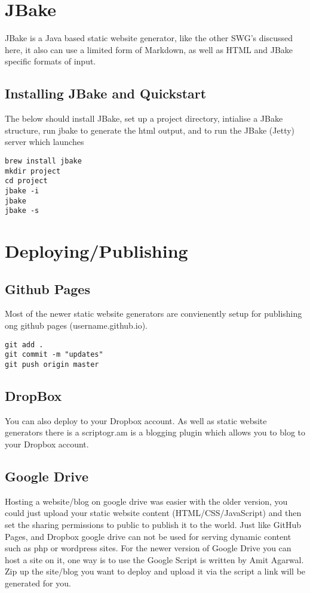 \documentclass[12pt]{article}			%
\begin{document}
\newpage
\section{JBake}
JBake is a Java based static website generator, like the other SWG's discussed here, it also can use a limited form of Markdown, as well as HTML and JBake specific formats of input.
\subsection{Installing JBake and Quickstart}
The below should install JBake, set up a project directory, intialise a JBake structure, run jbake to generate the html output, and to run the JBake (Jetty) server which launches 
\begin{verbatim}
brew install jbake
mkdir project
cd project
jbake -i
jbake
jbake -s
\end{verbatim}


\newpage
\section{Deploying/Publishing}
\subsection{Github Pages}
Most of the newer static website generators are convienently setup for publishing ong github pages (username.github.io).
\begin{verbatim}
git add .
git commit -m "updates"
git push origin master
\end{verbatim}

\subsection{DropBox}
You can also deploy to your Dropbox account. As well as static website generators there is a scriptogr.am is a blogging plugin which allows you to blog to your Dropbox account.

\subsection{Google Drive}
Hosting a website/blog on google drive was easier with the older version, you could just upload your static website content (HTML/CSS/JavaScript) and then set the sharing permissions to public to publish it to the world. Just like GitHub Pages, and Dropbox google drive can not be used for serving dynamic content such as php or wordpress sites.
For the newer version of Google Drive you can host a site on it, one way is to use the Google Script is written by Amit Agarwal. Zip up the site/blog you want to deploy and upload it via the script a link will be generated for you.
\end{document}
